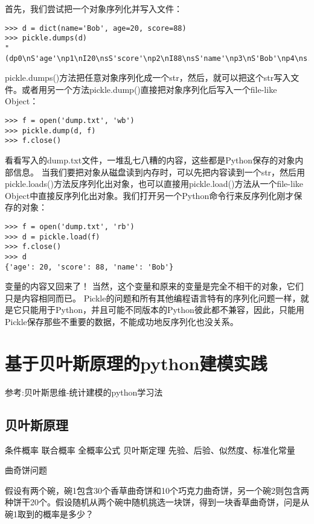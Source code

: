 \documentclass[twoside,11pt]{book}
\begin{document}
首先，我们尝试把一个对象序列化并写入文件：
\begin{lstlisting}
>>> d = dict(name='Bob', age=20, score=88)
>>> pickle.dumps(d)
"(dp0\nS'age'\np1\nI20\nsS'score'\np2\nI88\nsS'name'\np3\nS'Bob'\np4\ns."
\end{lstlisting}

pickle.dumps()方法把任意对象序列化成一个str，然后，就可以把这个str写入文件。或者用另一个方法pickle.dump()直接把对象序列化后写入一个file-like Object：
\begin{lstlisting}
>>> f = open('dump.txt', 'wb')
>>> pickle.dump(d, f)
>>> f.close()
\end{lstlisting}

看看写入的dump.txt文件，一堆乱七八糟的内容，这些都是Python保存的对象内部信息。
当我们要把对象从磁盘读到内存时，可以先把内容读到一个str，然后用pickle.loads()方法反序列化出对象，也可以直接用pickle.load()方法从一个file-like Object中直接反序列化出对象。我们打开另一个Python命令行来反序列化刚才保存的对象：
\begin{lstlisting}
>>> f = open('dump.txt', 'rb')
>>> d = pickle.load(f)
>>> f.close()
>>> d
{'age': 20, 'score': 88, 'name': 'Bob'}
\end{lstlisting}

变量的内容又回来了！
当然，这个变量和原来的变量是完全不相干的对象，它们只是内容相同而已。
Pickle的问题和所有其他编程语言特有的序列化问题一样，就是它只能用于Python，并且可能不同版本的Python彼此都不兼容，因此，只能用Pickle保存那些不重要的数据，不能成功地反序列化也没关系。

\chapter{基于贝叶斯原理的python建模实践}
参考:贝叶斯思维-统计建模的python学习法

\section{贝叶斯原理}
条件概率
联合概率
全概率公式
贝叶斯定理
先验、后验、似然度、标准化常量

曲奇饼问题

假设有两个碗，碗1包含30个香草曲奇饼和10个巧克力曲奇饼，另一个碗2则包含两种饼干20个。假设随机从两个碗中随机挑选一块饼，得到一块香草曲奇饼，问是从碗1取到的概率是多少？
\end{document}
